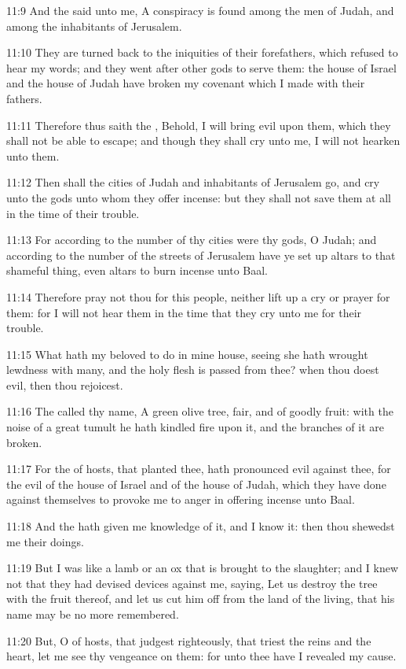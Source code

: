 11:9 And the \LORD said unto me, A conspiracy is found among the men of
Judah, and among the inhabitants of Jerusalem.

11:10 They are turned back to the iniquities of their forefathers,
which refused to hear my words; and they went after other gods to
serve them: the house of Israel and the house of Judah have broken my
covenant which I made with their fathers.

11:11 Therefore thus saith the \LORD, Behold, I will bring evil upon
them, which they shall not be able to escape; and though they shall
cry unto me, I will not hearken unto them.

11:12 Then shall the cities of Judah and inhabitants of Jerusalem go,
and cry unto the gods unto whom they offer incense: but they shall not
save them at all in the time of their trouble.

11:13 For according to the number of thy cities were thy gods, O
Judah; and according to the number of the streets of Jerusalem have ye
set up altars to that shameful thing, even altars to burn incense unto
Baal.

11:14 Therefore pray not thou for this people, neither lift up a cry
or prayer for them: for I will not hear them in the time that they cry
unto me for their trouble.

11:15 What hath my beloved to do in mine house, seeing she hath
wrought lewdness with many, and the holy flesh is passed from thee?
when thou doest evil, then thou rejoicest.

11:16 The \LORD called thy name, A green olive tree, fair, and of
goodly fruit: with the noise of a great tumult he hath kindled fire
upon it, and the branches of it are broken.

11:17 For the \LORD of hosts, that planted thee, hath pronounced evil
against thee, for the evil of the house of Israel and of the house of
Judah, which they have done against themselves to provoke me to anger
in offering incense unto Baal.

11:18 And the \LORD hath given me knowledge of it, and I know it: then
thou shewedst me their doings.

11:19 But I was like a lamb or an ox that is brought to the slaughter;
and I knew not that they had devised devices against me, saying, Let
us destroy the tree with the fruit thereof, and let us cut him off
from the land of the living, that his name may be no more remembered.

11:20 But, O \LORD of hosts, that judgest righteously, that triest the
reins and the heart, let me see thy vengeance on them: for unto thee
have I revealed my cause.

